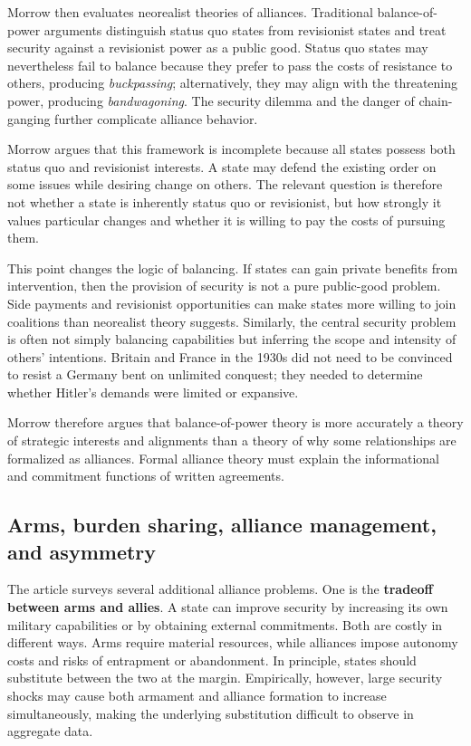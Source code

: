 Morrow then evaluates neorealist theories of alliances. Traditional balance-of-power arguments distinguish status quo states from revisionist states and treat security against a revisionist power as a public good. Status quo states may nevertheless fail to balance because they prefer to pass the costs of resistance to others, producing \emph{buckpassing}; alternatively, they may align with the threatening power, producing \emph{bandwagoning}. The security dilemma and the danger of chain-ganging further complicate alliance behavior.

Morrow argues that this framework is incomplete because all states possess both status quo and revisionist interests. A state may defend the existing order on some issues while desiring change on others. The relevant question is therefore not whether a state is inherently status quo or revisionist, but how strongly it values particular changes and whether it is willing to pay the costs of pursuing them.

This point changes the logic of balancing. If states can gain private benefits from intervention, then the provision of security is not a pure public-good problem. Side payments and revisionist opportunities can make states more willing to join coalitions than neorealist theory suggests. Similarly, the central security problem is often not simply balancing capabilities but inferring the scope and intensity of others' intentions. Britain and France in the 1930s did not need to be convinced to resist a Germany bent on unlimited conquest; they needed to determine whether Hitler's demands were limited or expansive.

Morrow therefore argues that balance-of-power theory is more accurately a theory of strategic interests and alignments than a theory of why some relationships are formalized as alliances. Formal alliance theory must explain the informational and commitment functions of written agreements.

\subsection{Arms, burden sharing, alliance management, and asymmetry}

The article surveys several additional alliance problems. One is the \textbf{tradeoff between arms and allies}. A state can improve security by increasing its own military capabilities or by obtaining external commitments. Both are costly in different ways. Arms require material resources, while alliances impose autonomy costs and risks of entrapment or abandonment. In principle, states should substitute between the two at the margin. Empirically, however, large security shocks may cause both armament and alliance formation to increase simultaneously, making the underlying substitution difficult to observe in aggregate data.


